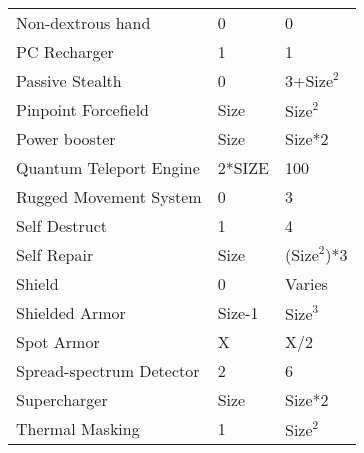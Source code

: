 \documentclass[twoside]{book}
\begin{document}
\begin{longtable}{p{1.25in}ll}
  \raggedright
           Non-dextrous hand 
  &
   0 
  &
   0 
  \tabularnewline
      
  \raggedright
           PC Recharger 
  &
   1 
  &
   1 
  \tabularnewline
      
  \raggedright
           Passive Stealth 
  &
   0 
  &
   3+\begin{math}{\textrm{Size}}^{2}\end{math} 
  \tabularnewline
      
  \raggedright
           Pinpoint Forcefield 
  &
   Size 
  &
   \begin{math}{\textrm{Size}}^{2}\end{math} 
  \tabularnewline
      
  \raggedright
           Power booster 
  &
   Size 
  &
   Size*2 
  \tabularnewline
      
  \raggedright
           Quantum Teleport Engine
           
  &
   2*SIZE 
  &
   100 
  \tabularnewline
      
  \raggedright
           Rugged Movement System 
  &
   0 
  &
   3 
  \tabularnewline
      
  \raggedright
           Self Destruct 
  &
   1 
  &
   4 
  \tabularnewline
      
  \raggedright
           Self Repair 
  &
   Size 
  &
   (\begin{math}{\textrm{Size}}^{2}\end{math})*3 
  \tabularnewline
      
  \raggedright
           Shield 
  &
   0 
  &
   Varies 
  \tabularnewline
      
  \raggedright
           Shielded Armor 
  &
   Size-1 
  &
   \begin{math}{\textrm{Size}}^{3}\end{math} 
  \tabularnewline
      
  \raggedright
           Spot Armor 
  &
   X 
  &
   X/2 
  \tabularnewline
      
  \raggedright
           Spread-spectrum Detector
           
  &
   2 
  &
   6 
  \tabularnewline
      
  \raggedright
           Supercharger 
  &
   Size 
  &
   Size*2 
  \tabularnewline
      
  \raggedright
           Thermal Masking 
  &
   1 
  &
   \begin{math}{\textrm{Size}}^{2}\end{math} 
  \tabularnewline
      

\end{longtable}
\end{document}
